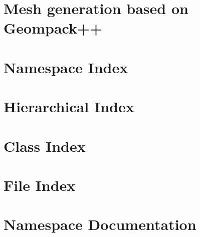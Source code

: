 \documentclass[twoside]{book}
\newcommand{\+}{\discretionary{\mbox{\scriptsize$\hookleftarrow$}}{}{}}
\begin{document}
  \raggedbottom
    \hypersetup{pageanchor=false,
                bookmarksnumbered=true,
                pdfencoding=unicode
               }
  \hypersetup{pageanchor=true}
\chapter{Mesh generation based on Geompack++}
\label{index}\hypertarget{index}{}
\chapter{Namespace Index}

\chapter{Hierarchical Index}

\chapter{Class Index}

\chapter{File Index}

\chapter{Namespace Documentation}



\end{document}

